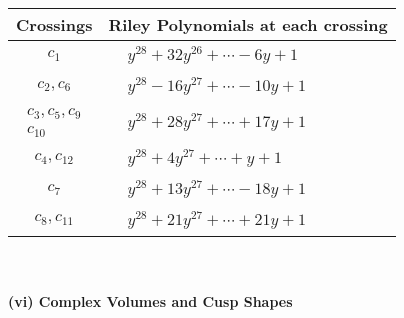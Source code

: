 \documentclass[1p]{elsarticle_modified}
\theoremstyle{definition}
\begin{document}
\begin{tabular}{m{50pt}|m{274pt}}
Crossings & \hspace{64pt}Riley Polynomials at each crossing \\
\hline $$\begin{aligned}c_{1}\end{aligned}$$&$\begin{aligned}
&y^{28}+32 y^{26}+\cdots-6 y+1
\end{aligned}$\\
\hline $$\begin{aligned}c_{2},c_{6}\end{aligned}$$&$\begin{aligned}
&y^{28}-16 y^{27}+\cdots-10 y+1
\end{aligned}$\\
\hline $$\begin{aligned}c_{3},c_{5},c_{9}\\c_{10}\end{aligned}$$&$\begin{aligned}
&y^{28}+28 y^{27}+\cdots+17 y+1
\end{aligned}$\\
\hline $$\begin{aligned}c_{4},c_{12}\end{aligned}$$&$\begin{aligned}
&y^{28}+4 y^{27}+\cdots+y+1
\end{aligned}$\\
\hline $$\begin{aligned}c_{7}\end{aligned}$$&$\begin{aligned}
&y^{28}+13 y^{27}+\cdots-18 y+1
\end{aligned}$\\
\hline $$\begin{aligned}c_{8},c_{11}\end{aligned}$$&$\begin{aligned}
&y^{28}+21 y^{27}+\cdots+21 y+1
\end{aligned}$\\
\hline
\end{tabular}\\~\\
\newpage\flushleft \textbf{(vi) Complex Volumes and Cusp Shapes}
\end{document}
